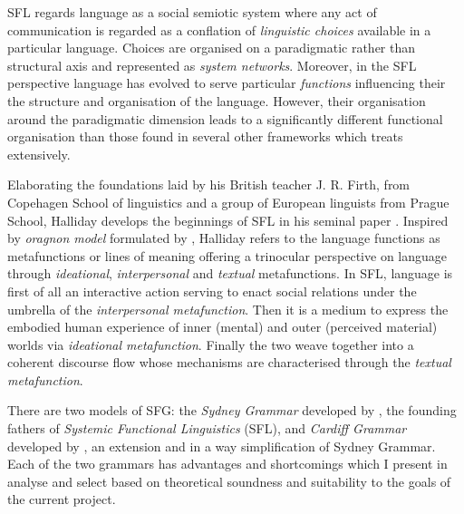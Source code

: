 
SFL regards language as a social semiotic system where any act of communication is regarded as a conflation of \textit{linguistic choices} available in a particular language. Choices are organised on a paradigmatic rather than structural axis and represented as \textit{system networks}. Moreover, in the SFL perspective language has evolved to serve particular \textit{functions} influencing their the structure and organisation of the language. However, their organisation around the paradigmatic dimension leads to a significantly different functional organisation than those found in several other frameworks which \citet{Butler2003-pt1, Butler2003-pt2} treats extensively. 

Elaborating the foundations laid by his British teacher J. R. Firth, \citet{Hjelmslev53} from Copehagen School of linguistics and a group of European linguists from Prague School, Halliday develops the beginnings of SFL in his seminal paper \cite{Halliday61-orig}. Inspired by \textit{oragnon model} formulated by \citet{Buhler34}, Halliday refers to the language functions as metafunctions or lines of meaning offering a trinocular perspective on language through \textit{ideational}, \textit{interpersonal} and \textit{textual} metafunctions.
In SFL, language is first of all an interactive action serving to enact social relations under the umbrella of the \textit{interpersonal metafunction}. Then it is a medium to express the embodied human experience of inner (mental) and outer (perceived material) worlds via \textit{ideational metafunction}. Finally the two weave together into a coherent discourse flow whose mechanisms are characterised through the \textit{textual metafunction}.


% 
There are two models of SFG: the \textit{Sydney Grammar} developed by \citet{Halliday2013}, the founding fathers of \textit{Systemic Functional Linguistics} (SFL), and \textit{Cardiff Grammar} developed by \citet{Fawcett2008}, an extension and in a way simplification of Sydney Grammar. Each of the two grammars has advantages and shortcomings which I present in analyse and select based on theoretical soundness and suitability to the goals of the current project.

